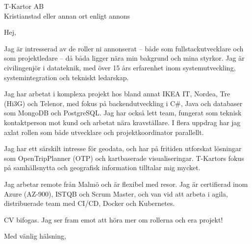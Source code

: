 \documentclass[a4paper,10pt]{letter}
\date{\today}
\begin{document}
\begin{letter}{T-Kartor AB\\[0.2cm]
Kristianstad eller annan ort enligt annons}

\opening{Hej,}

Jag är intresserad av de roller ni annonserat – både som fullstackutvecklare och som projektledare – då båda ligger nära min bakgrund och mina styrkor. Jag är civilingenjör i datateknik, med över 15 års erfarenhet inom systemutveckling, systemintegration och tekniskt ledarskap.

Jag har arbetat i komplexa projekt hos bland annat IKEA IT, Nordea, Tre (Hi3G) och Telenor, med fokus på backendutveckling i C\#, Java och databaser som MongoDB och PostgreSQL. Jag har också lett team, fungerat som teknisk kontaktperson mot kund och arbetat nära kravställare. I flera uppdrag har jag axlat rollen som både utvecklare och projektkoordinator parallellt.

Jag har ett särskilt intresse för geodata, och har på fritiden utforskat lösningar som OpenTripPlanner (OTP) och kartbaserade visualiseringar. T-Kartors fokus på samhällsnytta och geografisk information tilltalar mig mycket.

Jag arbetar remote från Malmö och är flexibel med resor. Jag är certifierad inom Azure (AZ-900), ISTQB och Scrum Master, och van vid att arbeta i agila, distribuerade team med CI/CD, Docker och Kubernetes.

CV bifogas. Jag ser fram emot att höra mer om rollerna och era projekt!

\closing{Med vänlig hälsning,}

\end{letter}
\end{document}
